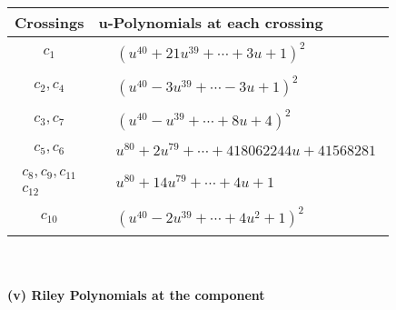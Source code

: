 \documentclass[1p]{elsarticle_modified}
\theoremstyle{definition}
\begin{document}
\begin{tabular}{m{50pt}|m{274pt}}
Crossings & \hspace{64pt}u-Polynomials at each crossing \\
\hline $$\begin{aligned}c_{1}\end{aligned}$$&$\begin{aligned}
&(u^{40}+21 u^{39}+\cdots+3 u+1)^{2}
\end{aligned}$\\
\hline $$\begin{aligned}c_{2},c_{4}\end{aligned}$$&$\begin{aligned}
&(u^{40}-3 u^{39}+\cdots-3 u+1)^{2}
\end{aligned}$\\
\hline $$\begin{aligned}c_{3},c_{7}\end{aligned}$$&$\begin{aligned}
&(u^{40}- u^{39}+\cdots+8 u+4)^{2}
\end{aligned}$\\
\hline $$\begin{aligned}c_{5},c_{6}\end{aligned}$$&$\begin{aligned}
&u^{80}+2 u^{79}+\cdots+418062244 u+41568281
\end{aligned}$\\
\hline $$\begin{aligned}c_{8},c_{9},c_{11}\\c_{12}\end{aligned}$$&$\begin{aligned}
&u^{80}+14 u^{79}+\cdots+4 u+1
\end{aligned}$\\
\hline $$\begin{aligned}c_{10}\end{aligned}$$&$\begin{aligned}
&(u^{40}-2 u^{39}+\cdots+4 u^2+1)^{2}
\end{aligned}$\\
\hline
\end{tabular}\\~\\
\newpage\renewcommand{\arraystretch}{1}
\flushleft \textbf{(v) Riley Polynomials at the component}\newline \\
\end{document}
